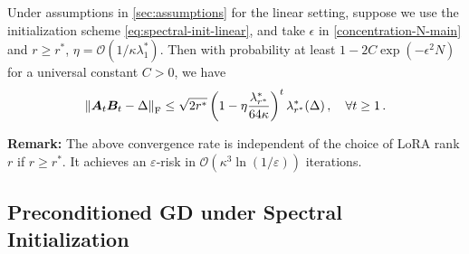 \begin{theorem}\label{thm:gc-linear-spec}
     Under assumptions in \cref{sec:assumptions} for the linear setting, suppose we use the initialization scheme \eqref{eq:spectral-init-linear}, and take $\epsilon$ in \cref{concentration-N-main} and $r\geq r^*$, $\eta = \mathcal{O}(1/\kappa\lambda_1^*)$. Then with probability at least $1-2C\exp(-\epsilon^2 N)$ for a universal constant $C>0$, we have
     \begin{align*}
    \left\|\bm A_t \bm B_t - \Delta\right\|_{\rm F} \leq \sqrt{2 r^*} \left(1 - \eta \frac{\lambda_{r^*}^*}{64 \kappa}\right)^{t}\lambda_{r^*}^*(\Delta)\,, \quad \forall t \geq 1\,.
\end{align*}

\end{theorem}
\noindent
{\bf Remark:} The above convergence rate is independent of the choice of LoRA rank $r$ if $r\geq r^*$.
It achieves an $\varepsilon$-risk in $\mathcal{O}\left(\kappa^3\ln\left(1/\varepsilon\right)\right)$ iterations.


\subsection{Preconditioned GD under Spectral Initialization}
\label{sec:scaledgd}

